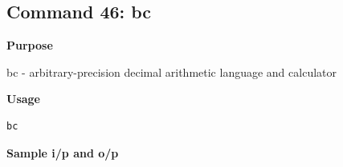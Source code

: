 \subsection{Command 46: bc} 
\textbf{Purpose}
\begin{flushleft}
       bc - arbitrary-precision decimal arithmetic language and calculator
\end{flushleft}
\textbf{Usage}
\begin{verbatim}
bc
\end{verbatim}
\textbf{Sample i/p and o/p}
\begin{figure}[H] 
\end{figure}
